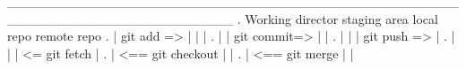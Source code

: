 
________________________________________________________________________
. Working director       staging area      local repo        remote repo 
.        |   git add =>        |                |                  |
.        |                     | git commit=>   |                  |
.        |                     |                |   git push =>    |         
.        |                     |                |   <= git fetch   |
.        |              <== git checkout        |                  |
.        |               <==  git merge         |                  |
